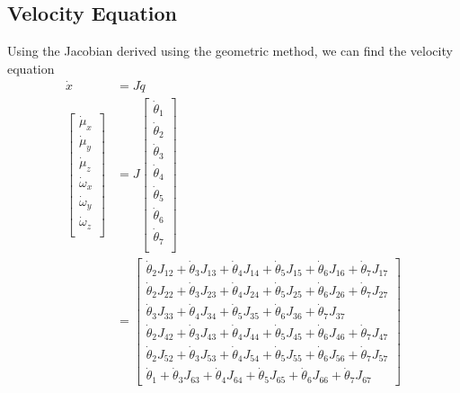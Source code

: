 \documentclass{article}
\begin{document}
\subsection{Velocity Equation}
Using the Jacobian derived using the geometric method, we can find the velocity equation
\begin{align*}
\dot{x} &= J \dot{q} \\
\left[\begin{matrix}
\dot{\mu}_x \\
\dot{\mu}_y \\
\dot{\mu}_z \\
\dot{\omega}_x \\
\dot{\omega}_y \\
\dot{\omega}_z \\
\end{matrix}\right]
&= J
\left[\begin{matrix}
\dot{\theta}_1 \\
\dot{\theta}_2 \\
\dot{\theta}_3 \\
\dot{\theta}_4 \\
\dot{\theta}_5 \\
\dot{\theta}_6 \\
\dot{\theta}_7 \\
\end{matrix}\right] \\
&=
\left[\begin{matrix}
\dot{\theta}_{2} J_{12} + \dot{\theta}_{3} J_{13} + \dot{\theta}_{4} J_{14} + \dot{\theta}_{5} J_{15} + \dot{\theta}_{6} J_{16} + \dot{\theta}_{7} J_{17}\\
\dot{\theta}_{2} J_{22} + \dot{\theta}_{3} J_{23} + \dot{\theta}_{4} J_{24} + \dot{\theta}_{5} J_{25} + \dot{\theta}_{6} J_{26} + \dot{\theta}_{7} J_{27}\\
\dot{\theta}_{3} J_{33} + \dot{\theta}_{4} J_{34} + \dot{\theta}_{5} J_{35} + \dot{\theta}_{6} J_{36} + \dot{\theta}_{7} J_{37}\\
\dot{\theta}_{2} J_{42} + \dot{\theta}_{3} J_{43} + \dot{\theta}_{4} J_{44} + \dot{\theta}_{5} J_{45} + \dot{\theta}_{6} J_{46} + \dot{\theta}_{7} J_{47}\\
\dot{\theta}_{2} J_{52} + \dot{\theta}_{3} J_{53} + \dot{\theta}_{4} J_{54} + \dot{\theta}_{5} J_{55} + \dot{\theta}_{6} J_{56} + \dot{\theta}_{7} J_{57}\\
\dot{\theta}_{1} + \dot{\theta}_{3} J_{63} + \dot{\theta}_{4} J_{64} + \dot{\theta}_{5} J_{65} + \dot{\theta}_{6} J_{66} + \dot{\theta}_{7} J_{67}
\end{matrix}\right]
\end{align*}
\end{document}
